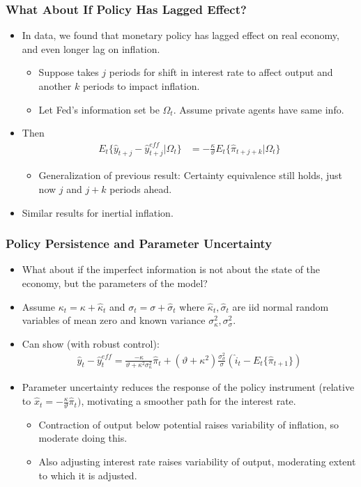 \documentclass[english,xcolor=svgnames]{beamer}
\begin{document}
\begin{frame}
\frametitle{What About If Policy Has Lagged Effect?}
\begin{itemize}
	\item In data, we found that monetary policy has lagged effect on real economy, and even longer lag on inflation.
	\begin{itemize}
		\item Suppose takes $j$ periods for shift in interest rate to affect output and another $k$ periods to impact inflation.
		\item Let Fed's information set be $\Omega_t$. Assume private agents have same info.
	\end{itemize}
 	\item Then
 	\begin{align*}
		E_t\{\hat{y}_{t+j}-\hat{y}_{t+j}^{eff}|\Omega_t\} &=-\frac{\kappa}{\vartheta}E_{t}\{\hat{\pi}_{t+j+k}|\Omega_t\}
	\end{align*}
 	\begin{itemize}
 		\item Generalization of previous result: Certainty equivalence still holds, just now $j$ and $j+k$ periods ahead.
 	\end{itemize}
 	\item Similar results for inertial inflation.
 \end{itemize}
\end{frame}

\begin{frame}
\frametitle{Policy Persistence and Parameter Uncertainty}
\begin{itemize}
	\item What about if the imperfect information is not about the state of the economy, but the parameters of the model?
	\item Assume $\kappa_t=\kappa+\hat{\kappa}_t$ and $\sigma_t=\sigma+\hat{\sigma}_t$ where $\hat{\kappa}_t,\hat{\sigma}_t$ are iid normal random variables of mean zero and known variance $\sigma_\kappa^2,\sigma_\sigma^2$.
	\item Can show (with robust control):
	\begin{align*}
		\hat{y}_{t}-\hat{y}_{t}^{eff}=\frac{-\kappa}{\vartheta+\kappa^2\sigma_\kappa^2}\hat{\pi}_t+(\vartheta+\kappa^2)\frac{\sigma^2_{\sigma}}{\sigma}(\hat{i}_t-E_t\{\hat{\pi}_{t+1}\})
	\end{align*}
	\item Parameter uncertainty reduces the response of the policy
  instrument (relative to $\hat{x}_t = -\frac{\kappa}{\vartheta}\hat{\pi}_t)$, motivating a smoother path for the interest rate.
	\begin{itemize}
		\item Contraction of output below potential raises variability of inflation, so moderate doing this.
		\item Also adjusting interest rate raises variability of output, moderating extent to which it is adjusted.
	\end{itemize}
 \end{itemize}
\end{frame}
\end{document}
